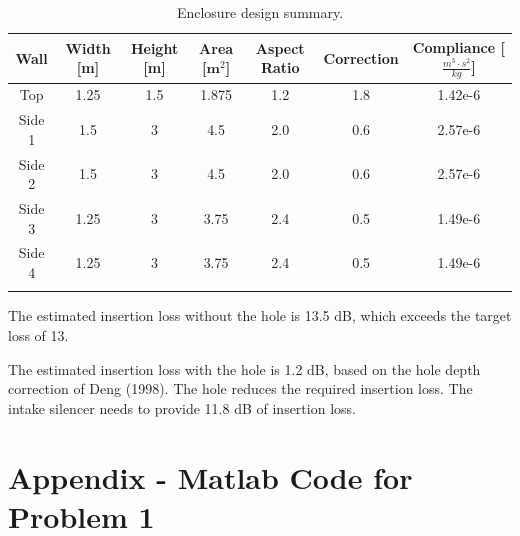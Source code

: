 {{{\vspace{0.25cm}
\setlength{\abovecaptionskip}{0pt}
\vspace{0.1cm}
{\renewcommand{\arraystretch}{1.25}
\begin{table}[h!]
    \begin{center}
        \small
        \begin{tabular}{ | c | c | c | c | c | c | c | }
            \hline
            \textbf{Wall}  &  \textbf{Width [m]}  &  \textbf{Height [m]}  &  \textbf{Area [$\mathbf m^2$]}  &  \textbf{Aspect Ratio}  &  \textbf{Correction}  &  \textbf{Compliance [$\frac{m^3\cdot s^2}{kg}$]}  \\
            \hline
            Top     &  1.25  &  1.5  &  1.875  &  1.2   &  1.8  &  1.42e-6  \\
            \hline
            Side 1  &  1.5   &  3    &  4.5    &  2.0   &  0.6  &  2.57e-6  \\
            Side 2  &  1.5   &  3    &  4.5    &  2.0   &  0.6  &  2.57e-6  \\
            \hline
            Side 3  &  1.25   &  3    &  3.75    &  2.4   &  0.5  &  1.49e-6  \\
            Side 4  &  1.25   &  3    &  3.75    &  2.4   &  0.5  &  1.49e-6  \\
            \rowcolor{Gray}
            \hline
        \end{tabular}
    \end{center}
    \caption{Enclosure design summary.}
    \label{table:DesignParametersEnclosure}
\end{table}


The estimated insertion loss without the hole is 13.5 dB, which exceeds the target loss of 13.

\vspace{0.25cm}
The estimated insertion loss with the hole is 1.2 dB, based on the hole depth correction of Deng (1998).  The hole reduces the required insertion loss.  The intake silencer needs to provide 11.8 dB of insertion loss.






\newpage
\section{Appendix - Matlab Code for Problem 1}
\label{appendix:problem1}




}}}}

